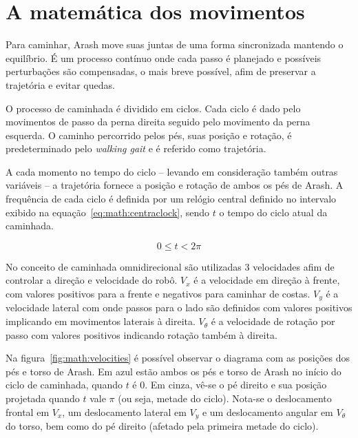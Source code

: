 \chapter{A matemática dos movimentos}
\label{ch:Math}

Para caminhar, Arash move suas juntas de uma forma sincronizada mantendo o equilíbrio. É um processo contínuo onde cada passo é planejado e possíveis perturbações são compensadas, o mais breve possível, afim de preservar a trajetória e evitar quedas.

O processo de caminhada é dividido em ciclos. Cada ciclo é dado pelo movimentos de passo da perna direita seguido pelo movimento da perna esquerda. O caminho percorrido pelos pés, suas posição e rotação, é predeterminado pelo \textit{walking gait} e é referido como trajetória.

A cada momento no tempo do ciclo -- levando em consideração também outras variáveis -- a trajetória fornece a posição e rotação de ambos os pés de Arash. A frequência de cada ciclo é definida por um relógio central definido no intervalo exibido na equação~\ref{eq:math:centraclock}, sendo $t$ o tempo do ciclo atual da caminhada.

\begin{equation}
	\label{eq:math:centraclock}
	0 \leq t < 2\pi
\end{equation}

No conceito de caminhada omnidirecional são utilizadas 3 velocidades afim de controlar a direção e velocidade do robô. $V_x$ é a velocidade em direção à frente, com valores positivos para a frente e negativos para caminhar de costas. $V_y$ é a velocidade lateral com onde passos para o lado são definidos com valores positivos implicando em movimentos laterais à direita. $V_\theta$ é a velocidade de rotação por passo com valores positivos indicando rotação também à direita.

Na figura~\ref{fig:math:velocities} é possível observar o diagrama com as posições dos pés e torso de Arash. Em azul estão ambos os pés e torso de Arash no início do ciclo de caminhada, quando $t$ é $0$. Em cinza, vê-se o pé direito e sua posição projetada quando $t$ vale $\pi$ (ou seja, metade do ciclo). Nota-se o deslocamento frontal em $V_x$, um deslocamento lateral em $V_y$ e um deslocamento angular em $V_\theta$ do torso, bem como do pé direito (afetado pela primeira metade do ciclo).

